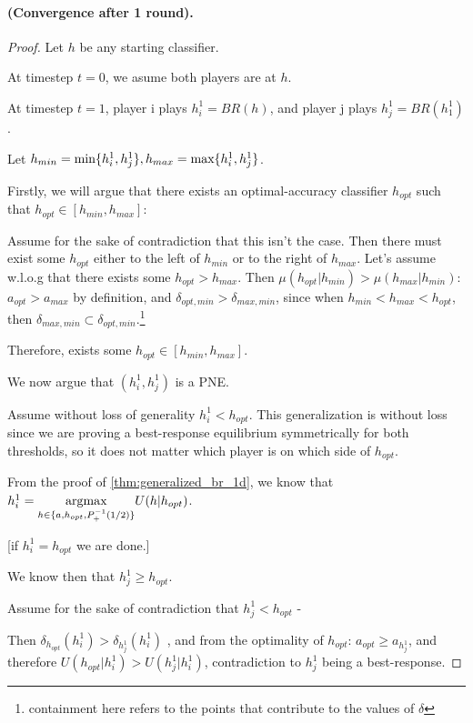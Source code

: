 \paragraph{ 
(Convergence after 1 round).}

\begin{proof}
    Let $h$ be any starting classifier.

    At timestep $t=0$, we asume both players are at $h$.
    
    At timestep $t=1$, player i plays $h_i^1 = BR(h)$,  and player j plays $h_j^1 = BR(h_1^1)$.

    Let $h_{min} = \text{min} \{h_i^1,  h_j^1\}, h_{max} = \text{max} \{h_i^1,  h_j^1\}$.
    
    Firstly, we will argue that there exists an optimal-accuracy classifier $h_{opt}$ such that $h_{opt} \in [h_{min}, h_{max}]$:

    Assume for the sake of contradiction that this isn't the case. Then there must exist some $h_{opt}$ either to the left of $h_{min}$ or to the right of $h_{max}$. Let's assume w.l.o.g that there exists some $h_{opt} > h_{max}$.
    Then $\mu(h_{opt}|h_{min})>\mu(h_{max}|h_{min})$: $a_{opt} > a_{max}$ by definition, and $\delta_{opt, min} > \delta_{max,min}$, since when $h_{min} < h_{max} < h_{opt}$, then $\delta_{max,min} \subset \delta_{opt,min}$.\footnote{containment here refers to the points that contribute to the values of $\delta$} 

    Therefore, exists some $h_{opt} \in [h_{min}, h_{max}]$.
    
    We now argue that $(h_i^1, h_j^1)$ is a PNE.

    
    Assume without loss of generality $h_i^1 < h_{opt}$. This generalization is without loss since we are proving a best-response equilibrium symmetrically for both thresholds, so it does not matter which player is on which side of $h_{opt}$.
    
    From the proof of \cref{thm:generalized_br_1d}, we know that $h_i^1 = \underset{h \in \{a,h_{opt}, P_+^{-1}(1/2)\}}{\operatorname*{argmax}} U(h|h_{opt})$.

    [if $h_i^1 = h_{opt}$ we are done.]

    We know then that $h_j^1 \ge h_{opt}$.
    
     Assume for the sake of contradiction that $h_j^1 < h_{opt}$ -
     
     Then  $\delta_{h_{opt}}(h_i^1) > \delta_{h_j^1}(h_i^1)$ , and from the optimality of $h_{opt}$: $a_{opt} \ge a_{h_j^1}$, and therefore $U(h_{opt}|h_i^1) > U(h_j^1|h_i^1) $, contradiction to $h_j^1$ being a best-response.


\end{proof}
